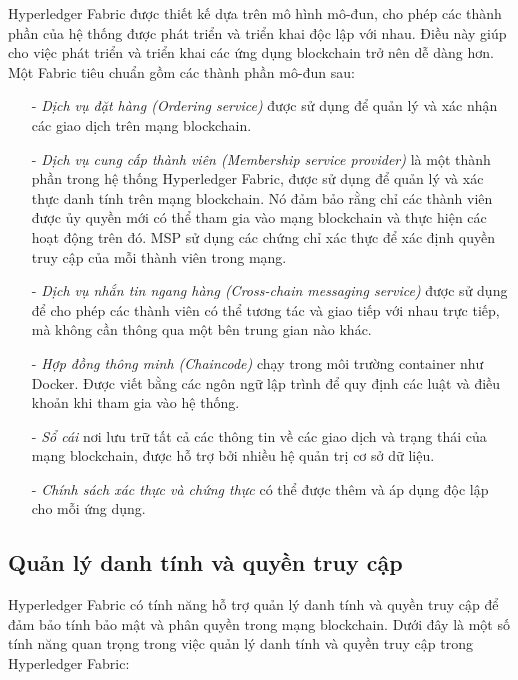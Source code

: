 Hyperledger Fabric được thiết kế dựa trên mô hình mô-đun, cho phép các thành phần của hệ 
thống được phát triển và triển khai độc lập với nhau. Điều này giúp cho việc phát triển và 
triển khai các ứng dụng blockchain trở nên dễ dàng hơn.
Một Fabric tiêu chuẩn gồm các thành phần mô-đun sau:
\begin{itemize}
    \item[-] \textit{Dịch vụ đặt hàng (Ordering service)} được sử dụng để quản lý và xác nhận các giao dịch 
    trên mạng blockchain.
    
    \item[-] \textit{Dịch vụ cung cấp thành viên (Membership service provider)} là một thành phần trong hệ thống Hyperledger Fabric, 
    được sử dụng để quản lý và xác thực danh tính trên mạng blockchain. Nó đảm bảo rằng chỉ 
    các thành viên được ủy quyền mới có thể tham gia vào mạng blockchain và thực hiện các 
    hoạt động trên đó. MSP sử dụng các chứng chỉ xác thực để xác định quyền truy cập của mỗi thành viên trong mạng.
    \item[-] \textit{Dịch vụ nhắn tin ngang hàng (Cross-chain messaging service)} được sử dụng để cho phép các thành viên có thể 
    tương tác và giao tiếp với nhau trực tiếp, mà không cần thông qua một bên trung gian nào khác.
    \item[-] \textit{Hợp đồng thông minh (Chaincode)} chạy trong môi trường container như Docker. 
    Được viết bằng các ngôn ngữ lập trình để quy định các luật và điều khoản khi tham gia vào hệ thống. 
    \item[-] \textit{Sổ cái} nơi lưu trữ tất cả các thông tin về các giao dịch và trạng thái của mạng blockchain, 
    được hỗ trợ bởi nhiều hệ quản trị cơ sở dữ liệu.
    \item[-] \textit{Chính sách xác thực và chứng thực} có thể được thêm và áp dụng độc lập cho mỗi ứng dụng.
   
\end{itemize}

\subsection{Quản lý danh tính và quyền truy cập}

Hyperledger Fabric có tính năng hỗ trợ quản lý danh tính và quyền truy cập để đảm bảo 
tính bảo mật và phân quyền trong mạng blockchain. Dưới đây là một số tính năng quan trọng 
trong việc quản lý danh tính và quyền truy cập trong Hyperledger Fabric:

